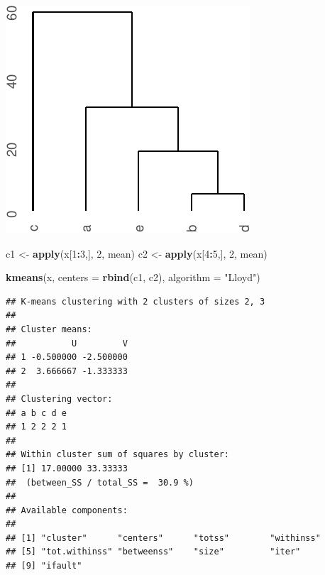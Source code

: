 \documentclass[]{article}
\newenvironment{Shaded}{\begin{snugshade}}{\end{snugshade}}
\newcommand{\DataTypeTok}[1]{\textcolor[rgb]{0.13,0.29,0.53}{#1}}
\newcommand{\DecValTok}[1]{\textcolor[rgb]{0.00,0.00,0.81}{#1}}
\newcommand{\KeywordTok}[1]{\textcolor[rgb]{0.13,0.29,0.53}{\textbf{#1}}}
\newcommand{\NormalTok}[1]{#1}
\newcommand{\OperatorTok}[1]{\textcolor[rgb]{0.81,0.36,0.00}{\textbf{#1}}}
\newcommand{\StringTok}[1]{\textcolor[rgb]{0.31,0.60,0.02}{#1}}
\begin{document}
\begin{center}\includegraphics{sol_A1_files/figure-latex/unnamed-chunk-2-2} \end{center}

\begin{Shaded}
\begin{Highlighting}[]
\NormalTok{c1 <-}\StringTok{ }\KeywordTok{apply}\NormalTok{(x[}\DecValTok{1}\OperatorTok{:}\DecValTok{3}\NormalTok{,], }\DecValTok{2}\NormalTok{, mean)}
\NormalTok{c2 <-}\StringTok{ }\KeywordTok{apply}\NormalTok{(x[}\DecValTok{4}\OperatorTok{:}\DecValTok{5}\NormalTok{,], }\DecValTok{2}\NormalTok{, mean)}


\KeywordTok{kmeans}\NormalTok{(x, }\DataTypeTok{centers =} \KeywordTok{rbind}\NormalTok{(c1, c2), }\DataTypeTok{algorithm =} \StringTok{"Lloyd"}\NormalTok{)}
\end{Highlighting}
\end{Shaded}

\begin{verbatim}
## K-means clustering with 2 clusters of sizes 2, 3
## 
## Cluster means:
##           U         V
## 1 -0.500000 -2.500000
## 2  3.666667 -1.333333
## 
## Clustering vector:
## a b c d e 
## 1 2 2 2 1 
## 
## Within cluster sum of squares by cluster:
## [1] 17.00000 33.33333
##  (between_SS / total_SS =  30.9 %)
## 
## Available components:
## 
## [1] "cluster"      "centers"      "totss"        "withinss"    
## [5] "tot.withinss" "betweenss"    "size"         "iter"        
## [9] "ifault"
\end{verbatim}

\begin{Shaded}
\end{Shaded}
\end{document}
